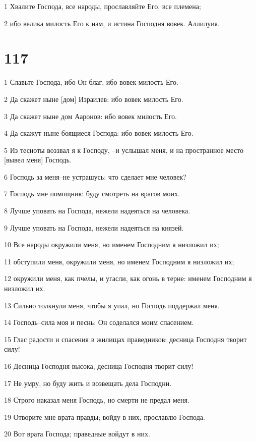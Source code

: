 \par 1 Хвалите Господа, все народы, прославляйте Его, все племена;
\par 2 ибо велика милость Его к нам, и истина Господня вовек. Аллилуия.

\chapter{117}

\par 1 Славьте Господа, ибо Он благ, ибо вовек милость Его.
\par 2 Да скажет ныне [дом] Израилев: ибо вовек милость Его.
\par 3 Да скажет ныне дом Ааронов: ибо вовек милость Его.
\par 4 Да скажут ныне боящиеся Господа: ибо вовек милость Его.
\par 5 Из тесноты воззвал я к Господу, --и услышал меня, и на пространное место [вывел меня] Господь.
\par 6 Господь за меня--не устрашусь: что сделает мне человек?
\par 7 Господь мне помощник: буду смотреть на врагов моих.
\par 8 Лучше уповать на Господа, нежели надеяться на человека.
\par 9 Лучше уповать на Господа, нежели надеяться на князей.
\par 10 Все народы окружили меня, но именем Господним я низложил их;
\par 11 обступили меня, окружили меня, но именем Господним я низложил их;
\par 12 окружили меня, как пчелы, и угасли, как огонь в терне: именем Господним я низложил их.
\par 13 Сильно толкнули меня, чтобы я упал, но Господь поддержал меня.
\par 14 Господь--сила моя и песнь; Он соделался моим спасением.
\par 15 Глас радости и спасения в жилищах праведников: десница Господня творит силу!
\par 16 Десница Господня высока, десница Господня творит силу!
\par 17 Не умру, но буду жить и возвещать дела Господни.
\par 18 Строго наказал меня Господь, но смерти не предал меня.
\par 19 Отворите мне врата правды; войду в них, прославлю Господа.
\par 20 Вот врата Господа; праведные войдут в них.
